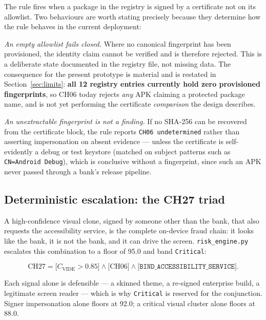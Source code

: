 \documentclass{article}
\begin{document}
The rule fires when a package in the registry is signed by a certificate not on
its allowlist. Two behaviours are worth stating precisely because they determine
how the rule behaves in the current deployment:

\emph{An empty allowlist fails closed.} Where no canonical fingerprint has been
provisioned, the identity claim cannot be verified and is therefore rejected.
This is a deliberate state documented in the registry file, not missing data.
The consequence for the present prototype is material and is restated in
Section~\ref{sec:limits}: \textbf{all 12 registry entries currently hold zero
provisioned fingerprints}, so CH06 today rejects \emph{any} APK claiming a
protected package name, and is not yet performing the certificate
\emph{comparison} the design describes.

\emph{An unextractable fingerprint is not a finding.} If no SHA-256 can be
recovered from the certificate block, the rule reports
\texttt{CH06 undetermined} rather than asserting impersonation on absent
evidence --- unless the certificate is self-evidently a debug or test keystore
(matched on subject patterns such as \texttt{CN=Android Debug}), which is
conclusive without a fingerprint, since such an APK never passed through a
bank's release pipeline.

\subsection{Deterministic escalation: the CH27 triad}
\label{ssec:ch27}

A high-confidence visual clone, signed by someone other than the bank, that
also requests the accessibility service, is the complete on-device fraud chain:
it looks like the bank, it is not the bank, and it can drive the screen.
\texttt{risk\_engine.py} escalates this combination to a floor of 95.0 and band
\texttt{Critical}:

\begin{equation}
\mathrm{CH27} =
\big[C_{\mathrm{VIDE}} > 0.85\big] \wedge
\big[\mathrm{CH06}\big] \wedge
\big[\texttt{BIND\_ACCESSIBILITY\_SERVICE}\big].
\label{eq:ch27}
\end{equation}

Each signal alone is defensible --- a skinned theme, a re-signed enterprise
build, a legitimate screen reader --- which is why \texttt{Critical} is reserved
for the conjunction. Signer impersonation alone floors at 92.0; a critical
visual cluster alone floors at 88.0.
\end{document}
